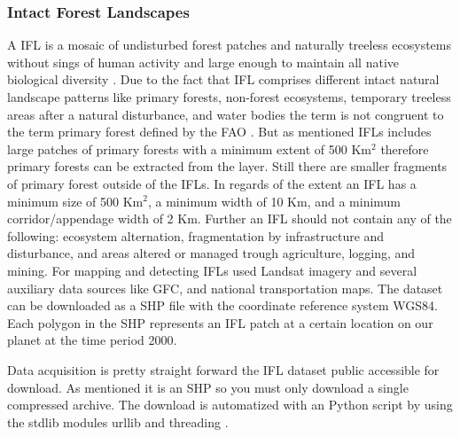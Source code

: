 		\subsubsection{Intact Forest Landscapes}
			A \ac{IFL} is a mosaic of undisturbed forest patches and naturally treeless ecosystems without sings of human activity and large enough to maintain all native biological diversity \citep{Potapov2017}. Due to the fact that \ac{IFL} comprises different intact natural landscape patterns like primary forests, non-forest ecosystems, temporary treeless areas after a natural disturbance, and water bodies the term is not congruent to the term primary forest defined by the \ac{FAO} \citep{FAO2012}. But as mentioned \ac{IFL}s includes large patches of primary forests with a minimum extent of 500 Km$^2$ therefore primary forests can be extracted from the layer. Still there are smaller fragments of primary forest outside of the \ac{IFL}s. In regards of the extent an \ac{IFL} has a minimum size of 500 Km$^2$, a minimum width of 10 Km, and a minimum corridor/appendage width of 2 Km. Further an \ac{IFL} should not contain any of the following: ecosystem alternation, fragmentation by infrastructure and disturbance, and areas altered or managed trough agriculture, logging, and mining. For mapping and detecting \ac{IFL}s \citeauthor{Potapov2017} used Landsat imagery and several auxiliary data sources like \ac{GFC}, and national transportation maps. The dataset can be downloaded as a \ac{SHP} file with the coordinate reference system \ac{WGS84}. Each polygon in the \ac{SHP} represents an \ac{IFL} patch at a certain location on our planet at the time period 2000.

			Data acquisition is pretty straight forward the \ac{IFL} dataset public accessible for download. As mentioned it is an \ac{SHP} so you must only download a single compressed archive. The download is automatized with an Python script by using the \ac{stdlib} modules urllib and threading \citep{Rossum2018}.


